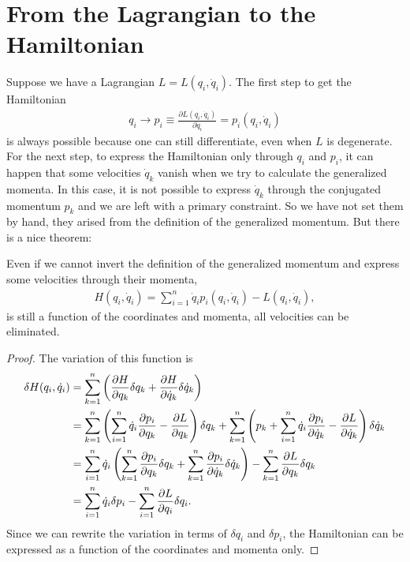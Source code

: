\section{From the Lagrangian to the Hamiltonian}
Suppose we have a Lagrangian $L = L(q_i,\dot{q}_i)$. The first step to get the Hamiltonian
\begin{align}
q_i \longrightarrow p_i \equiv \frac{\partial L(q_i,\dot{q}_i)}{\partial \dot{q}_i} = p_i(q_i,\dot{q}_i)
\end{align}
is always possible because one can still differentiate, even when $L$ is degenerate.
For the next step, to express the Hamiltonian only through $q_i$ and $p_i$, it can happen that some velocities $\dot{q}_k$ vanish when we try to calculate the generalized momenta. In this case, it is not possible to express $\dot{q}_k$ through the conjugated momentum $p_k$ and we are left with a primary constraint. So we have not set them by hand, they arised from the definition of the generalized momentum. But there is a nice theorem:
\begin{theorem}
Even if we cannot invert the definition of the generalized momentum and express some velocities through their momenta, 
\begin{align}
H(q_i,\dot{q}_i) = \sum_{i=1}^{n} \dot{q}_i p_i(q_i,\dot{q}_i) - L(q_i,\dot{q}_i), 
\end{align}
is still a function of the coordinates and momenta, all velocities can be eliminated.
\end{theorem}
\begin{proof}
The variation of this function is
\begin{align}
\delta H(q_i,\dot{q}_i) &= \sum_{k=1}^{n} \left( \frac{\partial H}{\partial q_k} \delta q_k + \frac{\partial H}{\partial \dot{q}_k} \delta \dot{q}_k \right) \notag \\
&= \sum_{k=1}^{n} \left( \sum_{i=1}^n \dot{q}_i \frac{\partial p_i}{\partial q_k} - \frac{\partial L}{\partial q_k} \right) \delta q_k + \sum_{k=1}^n \left( p_k + \sum_{i=1}^n \dot{q}_i \frac{\partial p_i}{\partial \dot{q}_k} - \frac{\partial L}{\partial \dot{q}_k} \right) \delta \dot{q}_k \notag \\
&= \sum_{i=1}^{n} \dot{q}_i \left( \sum_{k=1}^n \frac{\partial p_i}{\partial q_k} \delta q_k + \sum_{k=1}^n \frac{\partial p_i}{\partial \dot{q}_k} \delta \dot{q}_k \right) - \sum_{k=1}^n \frac{\partial L}{\partial q_k} \delta q_k \notag \\
&= \sum_{i=1}^n \dot{q}_i \delta p_i - \sum_{i=1}^n \frac{\partial L}{\partial q_i} \delta q_i.
\end{align}
Since we can rewrite the variation in terms of $\delta q_i$ and $\delta p_i$, the Hamiltonian can be expressed as a function of the coordinates and momenta only.
\end{proof}

